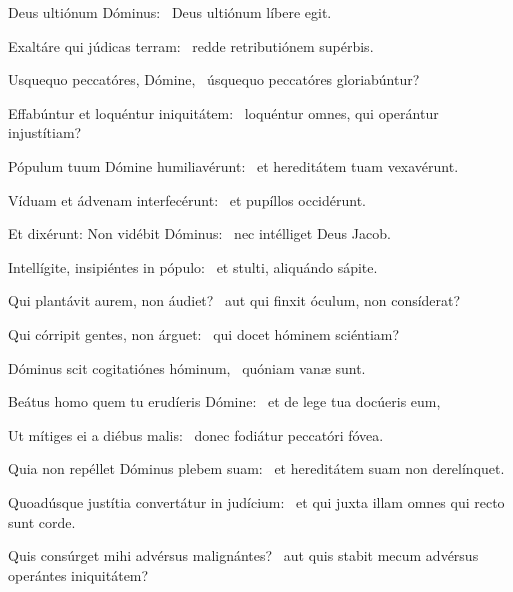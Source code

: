 \item Deus ultiónum Dóminus:~\psstar{} Deus ultiónum líbere egit.

\item Exaltáre qui júdicas terram:~\psstar{} redde retributiónem supérbis.

\item Usquequo peccatóres, Dómine,~\psstar{} úsquequo peccatóres gloriabúntur?

\item Effabúntur et loquéntur iniquitátem:~\psstar{} loquéntur omnes, qui operántur injustítiam?

\item Pópulum tuum Dómine humiliavérunt:~\psstar{} et hereditátem tuam vexavérunt.

\item Víduam et ádvenam interfe\-cérunt:~\psstar{} et pupíllos occidérunt.

\item Et dixérunt: Non vidébit Dóminus:~\psstar{} nec intélliget Deus Jacob.

\item Intellígite, insipiéntes in pópulo:~\psstar{} et stulti, aliquándo sápite.

\item Qui plantávit aurem, non áudiet?~\psstar{} aut qui finxit óculum, non consíderat?

\item Qui córripit gentes, non árguet:~\psstar{} qui docet hóminem sciéntiam?

\item Dóminus scit cogitatiónes hóminum,~\psstar{} quóniam vanæ sunt.

\item Beátus homo quem tu erudíeris Dómine:~\psstar{} et de lege tua docúeris eum,

\item Ut mítiges ei a diébus malis:~\psstar{} donec fodiátur peccatóri fóvea.

\item Quia non repéllet Dóminus plebem suam:~\psstar{} et hereditátem suam non derelínquet.

\item Quoadúsque justítia convertátur in judícium:~\psstar{} et qui juxta illam omnes qui recto sunt corde.

\item Quis consúrget mihi advérsus malignántes?~\psstar{} aut quis stabit mecum advérsus operántes iniquitátem?

